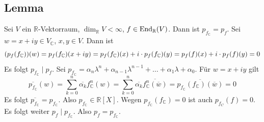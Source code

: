 \subsection[Lemma: Gleichheit der Minimalpolynome eines Endomorphismus und seiner Komplexifizierung]{Lemma} %
\label{sub:116}
Sei $V$ ein $\mathds{R}$-Vektorraum, $\dim_\mathds{R} V < \infty$, $f \in \operatorname{End}_{\mathbb{R}}(V)$. Dann ist $p_{f_\mathds{C}} = p_f$.
Sei $w= x + iy \in V_\mathds{C}$, $ x,y \in V$. Dann ist 
\[
	\enbrace*{p_f (f_\mathds{C})} (w) = p_f(f_\mathds{C})(x+iy) = p_f (f_\mathds{C}) (x) + i \cdot p_f(f_\mathds{C})(y)  =p_f (f) (x) + i \cdot  p_f (f)(y) = 0
\]
Es folgt $p_{f_\mathds{C}} \mid p_f$. Sei $p_{f_\mathds{C}} = \alpha_n \lambda^n + \alpha_{n-1} \lambda ^{n-1} + \ldots  + \alpha_1 \lambda  + \alpha_0$. Für 
$w=x+iy$ gilt
\[
	\overline{p_{f_\mathds{C}}} (w) = \sum_{k=0}^{n} \overline{\alpha_k} f_\mathds{C}^n (w) = \sum_{k=0}^{n} \overline{\alpha_k} \overline{f_\mathds{C}^n (\overline{w} )} 
	= \overline{p_{f_\mathds{C}} (f_\mathds{C}) (\overline{w} )} = 0    
\]
Es folgt $\overline{p_{f_\mathds{C}}} = p_{f_\mathds{C}}$. Also $p_{f_\mathds{C}} \in \mathds{R}[X]$. Wegen $p_{f_\mathds{C}} (f_\mathds{C}) = 0$ ist auch
$p_{f_C} (f) =0$. Es folgt weiter $p_f \mid p_{f_\mathds{C}}$. Also $p_f = p_{f_\mathds{C}}$. \bewende

